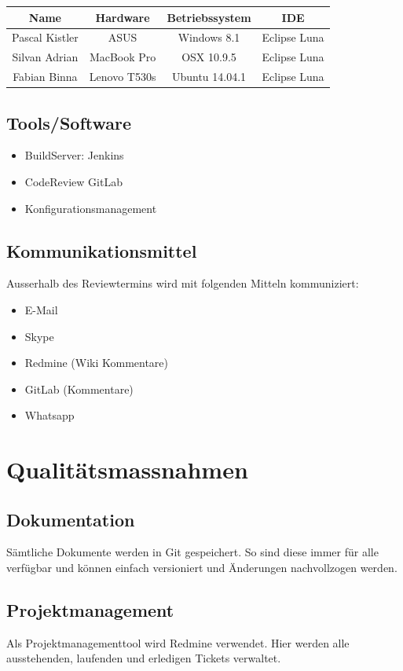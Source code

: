 \documentclass[11pt]{scrartcl}
\begin{document}
\begin{tabularx}{\textwidth}{c c c c}
\textbf{Name} & \textbf{Hardware} & \textbf{Betriebssystem} & \textbf{IDE} \\
\hline
Pascal Kistler & ASUS & Windows 8.1 & Eclipse Luna \\
\hline
Silvan Adrian & MacBook Pro & OSX 10.9.5 & Eclipse Luna \\
\hline
Fabian Binna & Lenovo T530s & Ubuntu 14.04.1 & Eclipse Luna \\
\hline
\end{tabularx}

\subsection{Tools/Software}
\label{sec:Tools/Software}
\begin{itemize}
    \item BuildServer: Jenkins
    \item CodeReview GitLab
    \item Konfigurationsmanagement
\end{itemize}

\subsection{Kommunikationsmittel}
\label{sec:Kommunikationsmittel}
Ausserhalb des Reviewtermins wird mit folgenden Mitteln kommuniziert:
\begin{itemize}
    \item E-Mail
    \item Skype
    \item Redmine (Wiki Kommentare)
    \item GitLab (Kommentare)
    \item Whatsapp
\end{itemize}

\section{Qualitätsmassnahmen}
\label{sec:Qualitätsmassnahmen}
\subsection{Dokumentation}
\label{sec:Dokumentation}
Sämtliche Dokumente werden in Git gespeichert. So sind diese immer für alle verfügbar und können einfach versioniert und Änderungen nachvollzogen werden.
\subsection{Projektmanagement}
\label{sec:Projektmanagement}
Als Projektmanagementtool wird Redmine verwendet. Hier werden alle ausstehenden, laufenden und erledigen Tickets verwaltet.
\end{document}
